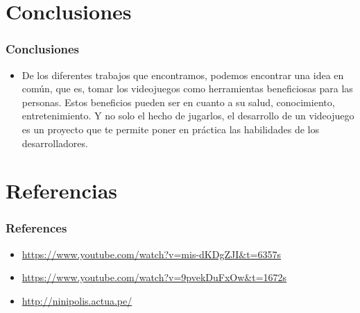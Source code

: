 \documentclass[11pt]{beamer}
\begin{document}
\section{Conclusiones}
\begin{frame}
\frametitle{Conclusiones}
\begin{itemize}
\item De los diferentes trabajos que encontramos, podemos encontrar una idea en común, que es, tomar los videojuegos como herramientas beneficiosas para las personas. Estos beneficios pueden ser en cuanto a su salud, conocimiento, entretenimiento. Y no solo el hecho de jugarlos, el desarrollo de un videojuego es un proyecto que te permite poner en práctica las habilidades de los desarrolladores.



\end{itemize}
\end{frame}

\section{Referencias}
\begin{frame}
\frametitle{References}
\begin{itemize}
\item \href{https://www.youtube.com/watch?v=mis-dKDgZJI&t=6357s}{https://www.youtube.com/watch?v=mis-dKDgZJI&t=6357s}
\item \href {https://www.youtube.com/watch?v=9pvekDuFxOw&t=1672s}{https://www.youtube.com/watch?v=9pvekDuFxOw&t=1672s}

\item \href {http://ninipolis.actua.pe/}{http://ninipolis.actua.pe/}



\end{itemize}
\end{frame}
\end{document}
